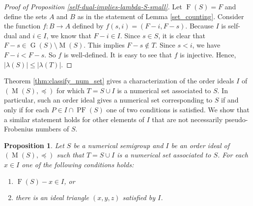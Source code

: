 \documentclass{amsproc}
\DeclareMathOperator{\F}{F}
\DeclareMathOperator{\G}{G}
\DeclareMathOperator{\PF}{PF}
\DeclareMathOperator{\M}{M}
\newtheorem{prop}[theorem]{Proposition}
\theoremstyle{definition}
\theoremstyle{remark}
\numberwithin{equation}{section}
\begin{document}
\begin{proof}[Proof of Proposition \ref{self-dual-implies-lambda-S-small}]
    Let $\F(S) = F$ and define the sets $A$ and $B$ as in the statement of Lemma \ref{set_counting}. Consider the function $f \colon B\rightarrow A$ defined by $f(s,i) = (F-i,F-s)$. Because $I$ is self-dual and $i \in I$, we know that $F-i\in I$. Since $s \in S$, it is clear that $F-s \in \G(S) \setminus \M(S)$. This implies $F-s \notin T$. Since $s< i$, we have $F-i < F-s$. So $f$ is well-defined. It is easy to see that $f$ is injective. Hence, $|\lambda(S)|\leq |\lambda(T)|$.
\end{proof}



Theorem \ref{thm:classify_num_set} gives a characterization of the order ideals $I$ of $(\M(S),\preccurlyeq)$ for which $T = S\cup I$ is a numerical set associated to $S$.  In particular, such an order ideal gives a numerical set corresponding to $S$ if and only if for each $P\in I\cap \PF(S)$ one of two conditions is satisfied.  We show that a similar statement holds for other elements of $I$ that are not necessarily pseudo-Frobenius numbers of $S$.
\begin{prop}
    \label{Element in I}
    Let $S$ be a numerical semigroup and $I$ be an order ideal of $(\M(S),\preccurlyeq)$ such that $T = S\cup I$ is a numerical set associated to $S$. 
For each $x \in I$ one of the following conditions holds:
    \begin{enumerate}
        \item $\F(S)-x\in I$, or
        \item there is an ideal triangle $(x,y,z)$ satisfied by $I$.
    \end{enumerate}
\end{prop}
\end{document}

